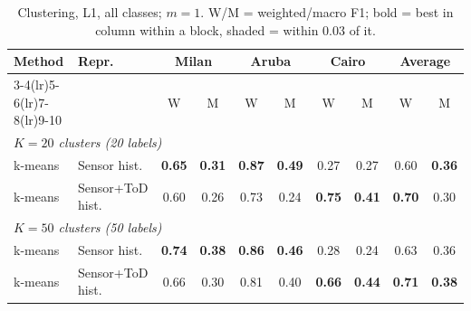 \begin{table}[H]
\centering\small
\caption{Clustering, L1, all classes; $m=1$. W/M = weighted/macro F1; bold = best in column within a block, shaded = within 0.03 of it.}
\label{tab:clu_l1_all_m1}
\setlength{\tabcolsep}{3.5pt}
\begin{tabular}{llcc|cc|cc|cc}
\toprule
Method & Repr. & \multicolumn{2}{c}{Milan} & \multicolumn{2}{c}{Aruba} & \multicolumn{2}{c}{Cairo} & \multicolumn{2}{c}{Average} \\
\cmidrule(lr){3-4}\cmidrule(lr){5-6}\cmidrule(lr){7-8}\cmidrule(lr){9-10}
 & & W & M & W & M & W & M & W & M \\
\midrule
\multicolumn{10}{l}{\textit{$K = 20$ clusters (20 labels)}} \\
\midrule
k-means & Sensor hist. & \cellcolor{blue!12}\textbf{0.65} & \cellcolor{blue!12}\textbf{0.31} & \cellcolor{blue!12}\textbf{0.87} & \cellcolor{blue!12}\textbf{0.49} & 0.27 & 0.27 & 0.60 & \cellcolor{blue!12}\textbf{0.36} \\
k-means & Sensor+ToD hist. & 0.60 & 0.26 & 0.73 & 0.24 & \cellcolor{blue!12}\textbf{0.75} & \cellcolor{blue!12}\textbf{0.41} & \cellcolor{blue!12}\textbf{0.70} & 0.30 \\
\midrule
\multicolumn{10}{l}{\textit{$K = 50$ clusters (50 labels)}} \\
\midrule
k-means & Sensor hist. & \cellcolor{blue!12}\textbf{0.74} & \cellcolor{blue!12}\textbf{0.38} & \cellcolor{blue!12}\textbf{0.86} & \cellcolor{blue!12}\textbf{0.46} & 0.28 & 0.24 & 0.63 & \cellcolor{blue!12}0.36 \\
k-means & Sensor+ToD hist. & 0.66 & 0.30 & 0.81 & 0.40 & \cellcolor{blue!12}\textbf{0.66} & \cellcolor{blue!12}\textbf{0.44} & \cellcolor{blue!12}\textbf{0.71} & \cellcolor{blue!12}\textbf{0.38} \\
\bottomrule
\end{tabular}
\end{table}


